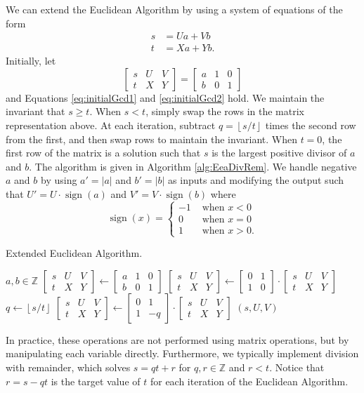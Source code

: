 \documentclass{ucalgthes1}
\theoremstyle{definition}
\DeclareMathOperator{\sign}{sign}
\newcommand{\ZZ}{\mathbb{Z}}
\newcommand{\matrixtt}[4]{\left[ \begin{array}{rr} #1 & #2 \\ #3 & #4 \end{array} \right]}
\newcommand{\matrixThreeTwo}[6]{\left[ \begin{array}{rrr} #1 & #2 & #3 \\ #4 & #5 & #6 \end{array} \right]}
\newcommand{\floor}[1]{\left\lfloor #1 \right\rfloor}
\begin{document}
We can extend the Euclidean Algorithm by using a system of equations of the form
\begin{align}
s &= Ua + Vb \label{eq:initialGcd1} \\
t &= Xa + Yb. \label{eq:initialGcd2}
\end{align}
Initially, let
\[
\matrixThreeTwo{s}{U}{V}{t}{X}{Y} = \matrixThreeTwo{a}{1}{0}{b}{0}{1}
\]
and Equations \ref{eq:initialGcd1} and \ref{eq:initialGcd2} hold.  We maintain the invariant that $s \ge t$.  When $s < t$, simply swap the rows in the matrix representation above.  At each iteration, subtract $q = \floor{s/t}$ times the second row from the first, and then swap rows to maintain the invariant.  When $t=0$, the first row of the matrix is a solution such that $s$ is the largest positive divisor of $a$ and $b$.  The algorithm is given in Algorithm \ref{alg:EeaDivRem}.  We handle negative $a$ and $b$ by using $a' = |a|$ and $b' = |b|$ as inputs and modifying the output such that $U' = U \cdot \sign(a)$ and $V' = V \cdot \sign(b)$ where
\[
	\sign(x) = \begin{cases}
		-1 & \textrm{ when } x < 0 \\
		0 & \textrm{ when } x = 0 \\
		1 & \textrm{ when } x > 0.
	\end{cases}
\]

\begin{algorithm}[h]
\caption{Extended Euclidean Algorithm.}
\label{alg:EeaDivRem}
\begin{algorithmic}[1]
\REQUIRE $a,b \in \ZZ$
\STATE $\matrixThreeTwo{s}{U}{V}{t}{X}{Y} \gets 
        \matrixThreeTwo{a}{1}{0}{b}{0}{1}$
	\STATE $\matrixThreeTwo{s}{U}{V}{t}{X}{Y} \gets
	        \matrixtt{0}{1}{1}{0} \cdot \matrixThreeTwo{s}{U}{V}{t}{X}{Y}$
\ENDIF
{}
	\STATE $q \gets \floor{s / t}$
	\STATE $\matrixThreeTwo{s}{U}{V}{t}{X}{Y} \gets \matrixtt{0}{1}{1}{-q} \cdot
		    \matrixThreeTwo{s}{U}{V}{t}{X}{Y}$ 
\ENDWHILE
\RETURN $(s, U, V)$ 
\end{algorithmic}
\end{algorithm}

In practice, these operations are not performed using matrix operations, but by manipulating each variable directly.  Furthermore, we typically implement division with remainder, which solves $s = qt + r$ for $q,r \in \ZZ$ and $r < t$.  Notice that $r = s - qt$ is the target value of $t$ for each iteration of the Euclidean Algorithm.  
\end{document}
